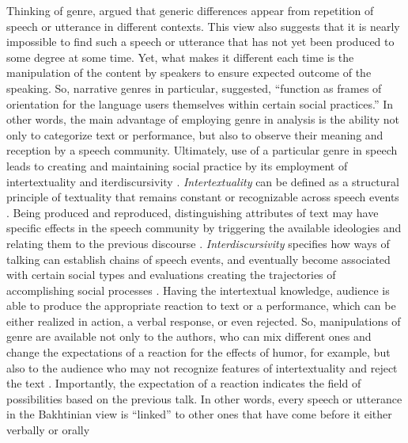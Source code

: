 \documentclass[12pt]{article}
\begin{document}
Thinking of genre, \textcite{bakhtin1986} argued that generic differences appear from repetition of speech or utterance in different contexts. This view also suggests that it is nearly impossible to find such a speech or utterance that has not yet been produced to some degree at some time. Yet, what makes it different each time is the manipulation of the content by speakers to ensure expected outcome of the speaking. So, narrative genres in particular, \textcite[p. 181]{hyvarinen2015} suggested, ``function as frames of orientation for the language users themselves within certain social practices.'' In other words, the main advantage of employing genre in analysis is the ability not only to categorize text or performance, but also to observe their meaning and reception by a speech community. Ultimately, use of a particular genre in speech leads to creating and maintaining social practice by its employment of intertextuality \parencite{briggs1992} and iterdiscursivity \parencite{wortham2015}. \textit{Intertextuality} can be defined as a structural principle of textuality that remains constant or recognizable across speech events \parencite{wortham2015}. Being produced and reproduced, distinguishing attributes of text may have specific effects in the speech community by triggering the available ideologies and relating them to the previous discourse \parencite{bakhtin1986}. \textit{Interdiscursivity} specifies how ways of talking can establish chains of speech events, and eventually become associated with certain social types and evaluations creating the trajectories of accomplishing social processes \parencite{agha2003}. Having the intertextual knowledge, audience is able to produce the appropriate reaction to text or a performance, which can be either realized in action, a verbal response, or even rejected. So, manipulations of genre are available not only to the authors, who can mix different ones and change the expectations of a reaction for the effects of humor, for example, but also to the audience who may not recognize features of intertextuality and reject the text \parencite{bax2011}. Importantly, the expectation of a reaction indicates the field of possibilities based on the previous talk. In other words, every speech or utterance in the Bakhtinian view is ``linked'' to other ones that have come before it either verbally or orally \parencite[p. 69]{bakhtin1986}
\end{document}
